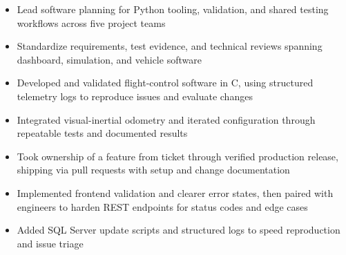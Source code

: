 \documentclass[10pt,letterpaper]{article}
\begin{document}
\bodyfont

\resumeheader
\educationsection




\orgline{\spartanracing}
\begin{itemize}
  \item Lead software planning for Python tooling, validation, and shared testing workflows across five project teams
  \item Standardize requirements, test evidence, and technical reviews spanning dashboard, simulation, and vehicle software
\end{itemize}

\entryspace

\begin{itemize}
  \item Developed and validated flight-control software in C, using structured telemetry logs to reproduce issues and evaluate changes
  \item Integrated visual-inertial odometry and iterated configuration through repeatable tests and documented results
\end{itemize}

\entryspace

\begin{itemize}
  \item Took ownership of a feature from ticket through verified production release, shipping via pull requests with setup and change documentation
  \item Implemented frontend validation and clearer error states, then paired with engineers to harden REST endpoints for status codes and edge cases
  \item Added SQL Server update scripts and structured logs to speed reproduction and issue triage
\end{itemize}
\end{document}
